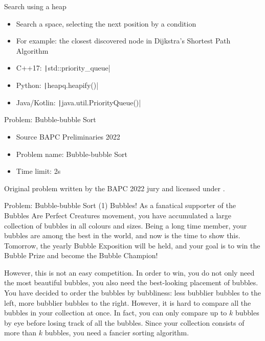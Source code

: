 \documentclass[11pt,pdf, aspectratio=169]{beamer}
\begin{document}
  \begin{frame}{Search using a heap}
    \begin{itemize}
      \item Search a space, selecting the next position by a condition
      \item For example: the closest discovered node in Dijkstra's Shortest Path Algorithm
      \item C++17: \texttt|std::priority_queue|
      \item Python: \texttt|heapq.heapify()|
      \item Java/Kotlin: \texttt|java.util.PriorityQueue()|
    \end{itemize}
  \end{frame}
  \begin{frame}{Problem: Bubble-bubble Sort}
    \begin{itemize}
      \item Source BAPC Preliminaries 2022
      \item Problem name: Bubble-bubble Sort
      \item Time limit: 2s
    \end{itemize}
    Original problem written by the BAPC 2022 jury and licensed under \doclicenseLongNameRef.

    \doclicenseImage

  \end{frame}
  \begin{frame}{Problem: Bubble-bubble Sort (1)}
    Bubbles!
    As a fanatical supporter of the Bubbles Are Perfect Creatures movement, you have accumulated a large collection of bubbles in all colours and sizes.
    Being a long time member, your bubbles are among the best in the world, and now is the time to show this.
    Tomorrow, the yearly Bubble Exposition will be held, and your goal is to win the Bubble Prize and become the Bubble Champion!

    However, this is not an easy competition.
    In order to win, you do not only need the most beautiful bubbles, you also need the best-looking placement of bubbles.
    You have decided to order the bubbles by bubbliness: less bubblier bubbles to the left, more bubblier bubbles to the right.
    However, it is hard to compare all the bubbles in your collection at once. In fact, you can only compare up to $k$ bubbles by eye before losing track of all the bubbles.
    Since your collection consists of more than $k$ bubbles, you need a fancier sorting algorithm.


  \end{frame}
\end{document}
